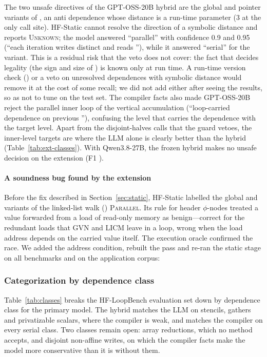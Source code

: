 The two unsafe directives of the GPT-OSS-20B hybrid are the global and pointer variants of , an anti dependence whose distance  is a run-time parameter (3 at the only call site). HF-Static cannot resolve the direction of a symbolic distance and reports \textsc{Unknown}; the model answered ``parallel'' with confidence 0.9 and 0.95 (``each iteration writes distinct  and reads ''), while it answered ``serial'' for the  variant. This is a residual risk that the veto does not cover: the fact that decides legality (the sign and size of ) is known only at run time. A run-time version check () or a veto on unresolved dependences with symbolic distance would remove it at the cost of some recall; we did not add either after seeing the results, so as not to tune on the test set. The compiler facts also made GPT-OSS-20B reject the parallel inner loop of the vertical accumulation (``loop-carried dependence on previous ''), confusing the level that carries the dependence with the target level. Apart from the disjoint-halves calls that the guard vetoes, the inner-level targets are where the LLM alone is clearly better than the hybrid (Table~\ref{tab:ext-classes}). With Qwen3.8-27B, the frozen hybrid makes no unsafe decision on the extension (F1 \xHQwenFone{}).




\paragraph{A soundness bug found by the extension} Before the fix described in Section~\ref{sec:static}, HF-Static labelled the global and  variants of the linked-list walk () \textsc{Parallel}. Its rule for header $\phi$-nodes treated a value forwarded from a load of read-only memory as benign---correct for the redundant loads that GVN and LICM leave in a loop, wrong when the load address depends on the carried value itself. The execution oracle confirmed the race. We added the address condition, rebuilt the pass and re-ran the static stage on all benchmarks and on the application corpus: \fixText{}

\subsubsection{Categorization by dependence class}
Table~\ref{tab:classes} breaks the HF-LoopBench evaluation set down by dependence class for the primary model. The hybrid matches the LLM on stencils, gathers and privatizable scalars, where the compiler is weak, and matches the compiler on every serial class. Two classes remain open: array reductions, which no method accepts, and disjoint non-affine writes, on which the compiler facts make the model more conservative than it is without them.

